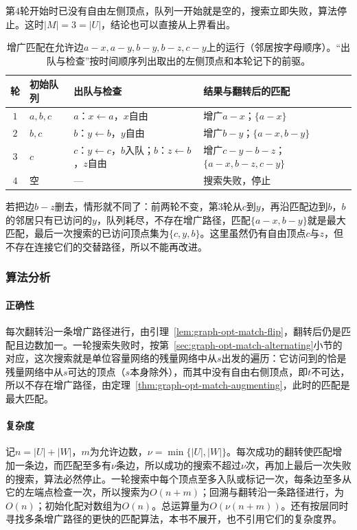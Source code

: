 第$4$轮开始时已没有自由左侧顶点，队列一开始就是空的，搜索立即失败，算法停止。这时$|M|=3=|U|$，结论也可以直接从上界看出。

\begin{table}[!htb]
  \centering\small
  \caption{增广匹配在允许边$a-x,a-y,b-y,b-z,c-y$上的运行（邻居按字母顺序）。“出队与检查”按时间顺序列出取出的左侧顶点和本轮记下的前驱。}
  \label{tab:graph-opt-match-trace}
  \begin{tabular}{@{}clll@{}}
    \toprule
    轮 & 初始队列 & 出队与检查 & 结果与翻转后的匹配 \\
    \midrule
    $1$ & $a,b,c$ & $a$：$x\leftarrow a$，$x$自由 & 增广$a-x$；$\{a-x\}$ \\
    $2$ & $b,c$ & $b$：$y\leftarrow b$，$y$自由 & 增广$b-y$；$\{a-x,b-y\}$ \\
    $3$ & $c$ & $c$：$y\leftarrow c$，$b$入队；$b$：$z\leftarrow b$，$z$自由 & 增广$c-y-b-z$；$\{a-x,b-z,c-y\}$ \\
    $4$ & 空 & — & 搜索失败，停止 \\
    \bottomrule
  \end{tabular}
\end{table}

若把边$b-z$删去，情形就不同了：前两轮不变，第$3$轮从$c$到$y$，再沿匹配边到$b$，$b$的邻居只有已访问的$y$，队列耗尽，不存在增广路径，匹配$\{a-x,b-y\}$就是最大匹配，最后一次搜索的已访问顶点集为$\{c,y,b\}$。这里虽然仍有自由顶点$c$与$z$，但不存在连接它们的交替路径，所以不能再改进。

\subsubsection{算法分析}

\paragraph{正确性}
每次翻转沿一条增广路径进行，由引理~\ref{lem:graph-opt-match-flip}，翻转后仍是匹配且边数加一。一轮搜索失败时，按第~\ref{sec:graph-opt-match-alternating}小节的对应，这次搜索就是单位容量网络的残量网络中从$s$出发的遍历：它访问到的恰是残量网络中从$s$可达的顶点（$s$本身除外），而其中没有自由右侧顶点，即$t$不可达，所以不存在增广路径，由定理~\ref{thm:graph-opt-match-augmenting}，此时的匹配是最大匹配。

\paragraph{复杂度}
记$n=|U|+|W|$，$m$为允许边数，$\nu=\min\{|U|,|W|\}$。每次成功的翻转使匹配增加一条边，而匹配至多有$\nu$条边，所以成功的搜索不超过$\nu$次，再加上最后一次失败的搜索，算法必然停止。一轮搜索中每个顶点至多入队或标记一次，每条边至多从它的左端点检查一次，所以搜索为$O(n+m)$；回溯与翻转沿一条路径进行，为$O(n)$；初始化配对数组为$O(n)$。总运算量为$O(\nu(n+m))$。还有按层同时寻找多条增广路径的更快的匹配算法，本书不展开，也不引用它们的复杂度界。

